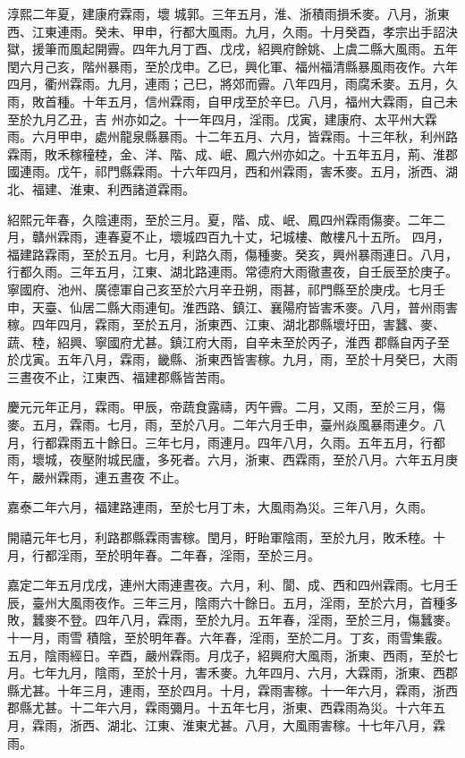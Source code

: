 \begin{pinyinscope}
 淳熙二年夏，建康府霖雨，壞
 城郭。三年五月，淮、浙積雨損禾麥。八月，浙東西、江東連雨。癸未、甲申，行都大風雨。九月，久雨。十月癸酉，孝宗出手詔決獄，援筆而風起開霽。四年九月丁酉、戊戌，紹興府餘姚、上虞二縣大風雨。五年閏六月己亥，階州暴雨，至於戊申。乙巳，興化軍、福州福清縣暴風雨夜作。六年四月，衢州霖雨。九月，連雨；己巳，將郊而霽。八年四月，雨腐禾麥。五月，久雨，敗首種。十年五月，信州霖雨，自甲戌至於辛巳。八月，福州大霖雨，自己未至於九月乙丑，吉
 州亦如之。十一年四月，淫雨。戊寅，建康府、太平州大霖雨。六月甲申，處州龍泉縣暴雨。十二年五月、六月，皆霖雨。十三年秋，利州路霖雨，敗禾稼穜稑，金、洋、階、成、岷、鳳六州亦如之。十五年五月，荊、淮郡國連雨。戊午，祁門縣霖雨。十六年四月，西和州霖雨，害禾麥。五月，浙西、湖北、福建、淮東、利西諸道霖雨。



 紹熙元年春，久陰連雨，至於三月。夏，階、成、岷、鳳四州霖雨傷麥。二年二月，贛州霖雨，連春夏不止，壞城四百九十丈，圮城樓、敵樓凡十五所。
 四月，福建路霖雨，至於五月。七月，利路久雨，傷種麥。癸亥，興州暴雨連日。八月，行都久雨。三年五月，江東、湖北路連雨。常德府大雨徹晝夜，自壬辰至於庚子。寧國府、池州、廣德軍自己亥至於六月辛丑朔，雨甚，祁門縣至於庚戌。七月壬申，天臺、仙居二縣大雨連旬。淮西路、鎮江、襄陽府皆害禾麥。八月，普州雨害稼。四年四月，霖雨，至於五月，浙東西、江東、湖北郡縣壞圩田，害蠶、麥、蔬、稑，紹興、寧國府尤甚。鎮江府大雨，自辛未至於丙子，淮西
 郡縣自丙子至於戊寅。五年八月，霖雨，畿縣、浙東西皆害稼。九月，雨，至於十月癸巳，大雨三晝夜不止，江東西、福建郡縣皆苦雨。



 慶元元年正月，霖雨。甲辰，帝蔬食露禱，丙午霽。二月，又雨，至於三月，傷麥。五月，霖雨。七月，雨，至於八月。二年六月壬申，臺州焱風暴雨連夕。八月，行都霖雨五十餘日。三年七月，雨連月。四年八月，久雨。五年五月，行都雨，壞城，夜壓附城民廬，多死者。六月，浙東、西霖雨，至於八月。六年五月庚午，嚴州霖雨，連五晝夜
 不止。



 嘉泰二年六月，福建路連雨，至於七月丁未，大風雨為災。三年八月，久雨。



 開禧元年七月，利路郡縣霖雨害稼。閏月，盱眙軍陰雨，至於九月，敗禾稑。十月，行都淫雨，至於明年春。二年春，淫雨，至於三月。



 嘉定二年五月戊戌，連州大雨連晝夜。六月，利、閬、成、西和四州霖雨。七月壬辰，臺州大風雨夜作。三年三月，陰雨六十餘日。五月，淫雨，至於六月，首種多敗，蠶麥不登。四年八月，霖雨，至於九月。五年春，淫雨，至於三月，傷蠶麥。十一月，雨雪
 積陰，至於明年春。六年春，淫雨，至於二月。丁亥，雨雪集霰。五月，陰雨經日。辛酉，嚴州霖雨。月戊子，紹興府大風雨，浙東、西雨，至於七月。七年九月，陰雨，至於十月，害禾麥。九年四月、六月，大霖雨，浙東、西郡縣尤甚。十年三月，連雨，至於四月。十月，霖雨害稼。十一年六月，霖雨，浙西郡縣尤甚。十二年六月，霖雨彌月。十五年七月，浙東、西霖雨為災。十六年五月，霖雨，浙西、湖北、江東、淮東尤甚。八月，大風雨害稼。十七年八月，霖雨。




\end{pinyinscope}
